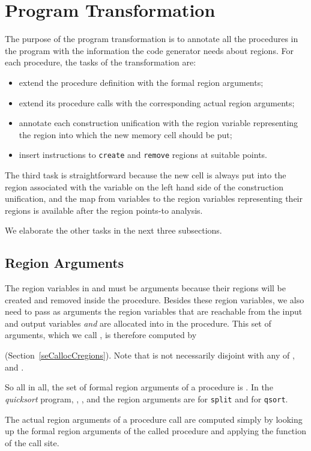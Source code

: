 \documentclass{tlp}
\newcommand{\code}[1]{{\tt#1}}
\begin{document}
\section{Program Transformation}
\label{seCpt}

The purpose of the program transformation is
to annotate all the procedures in the program
with the information the code generator needs about regions.
For each procedure, the tasks of the transformation are:
\begin{itemize}
    \item extend the procedure definition with the formal region arguments;
    \item extend its procedure calls
        with the corresponding actual region arguments;
    \item annotate each construction unification with the region variable
        representing the region into which the new memory cell should be put;
    \item insert instructions to \code{create} and \code{remove} regions
        at suitable points.
\end{itemize}
The third task is straightforward
because the new cell is always put into the region associated with
the variable on the left hand side of the construction unification,
and the map from variables to the region variables representing their regions
is available after the region points-to analysis.

We elaborate the other tasks in the next three subsections.

\subsection{Region Arguments}

The region variables in  and  must be arguments
because their regions will be created and removed inside the procedure.
Besides these region variables,
we also need to pass as arguments
the region variables that are reachable from the input and output variables
\emph{and} are allocated into in the procedure.
This set of arguments, which we call ,
is therefore computed by

(Section~\ref{seCallocCregions}).
Note that  is not necessarily disjoint
with any of ,  and .

So all in all, the set of formal region arguments of a procedure
is .
In the \emph{quicksort} program,
,
,
and the region arguments are
 for \code{split}
and  for \code{qsort}.

The actual region arguments of a procedure call are computed simply
by looking up the formal region arguments of the called procedure
and applying the  function of the call site.
\end{document}
